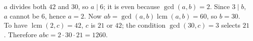 $a$ divides both $42$ and $30$, so $a\mid6$; it is even because $\gcd(a,b)=2$. Since $3\mid b$, $a$ cannot be $6$, hence $a=2$. Now $ab=\gcd(a,b)\operatorname{lcm}(a,b)=60$, so $b=30$. To have $\operatorname{lcm}(2,c)=42$, $c$ is $21$ or $42$; the condition $\gcd(30,c)=3$ selects $21$. Therefore $abc=2\cdot30\cdot21=\boxed{1260}$.
